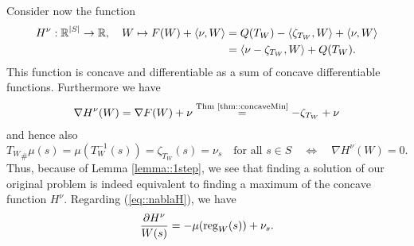 \documentclass[
     12pt,         %
     a4paper,      %
     BCOR=10mm,     %
     DIV=14,        %
     ]{scrreprt}
\begin{document}
    Consider now the function
    \begin{align*}
        H^\nu: \operatorname{\mathbb{R}}^{|S|} \to \operatorname{\mathbb{R}}, \quad W \mapsto F(W) + \langle \nu, W \rangle &= Q(T_W) - \langle \zeta_{T_{W}}, W \rangle + \langle \nu, W \rangle\\
                                                                              &= \langle \nu - \zeta_{T_{W}}, W \rangle + Q(T_W).
    \end{align*}
    This function is concave and differentiable as a sum of concave differentiable functions. Furthermore we have 
    \begin{align} \label{eq::nablaH}
        \nabla H^\nu(W) = \nabla F(W) + \nu \overset {\text{Thm \ref{thm::concaveMin}}}=  - \zeta_{T_{W}} + \nu 
    \end{align}
    and hence also
    \[ {T_{W}}_{\#}\mu(s) =\mu(T_W^{-1}(s)) = \zeta_{T_{W}}(s) = \nu_s \quad \text{for all  } s\in S \quad \Leftrightarrow \quad \nabla H^\nu(W) = 0. \]
    Thus, because of Lemma \ref{lemma::1step}, we see that finding a solution of our original problem is indeed equivalent to finding a maximum of the concave function $H^\nu$. Regarding (\ref{eq::nablaH}),
    we have
    \[ \frac{\partial H^\nu}{W(s)} = -\mu(\operatorname{reg}_W(s)) + \nu_s.  \]
    
\end{document}
